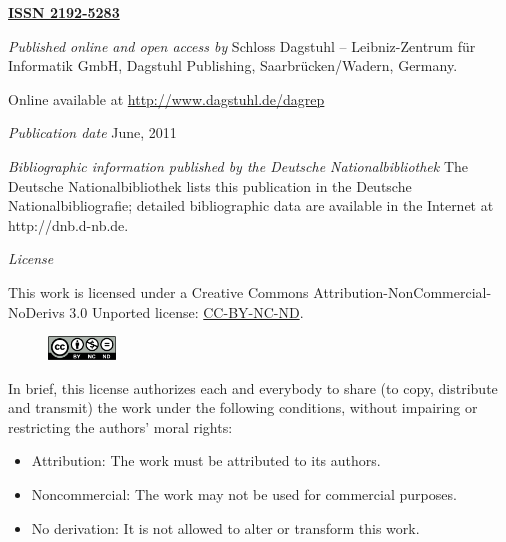 \documentclass[a4paper,USenglish]{dagrep-master}
\begin{document}
\begin{publicationinfo}%
\sffamily
\twocolumn



{\Large\bf\sffamily \textbf{\href{http://www.dagstuhl.de/dagrep}{ISSN 2192-5283}}}

\bigskip
\bigskip

\emph{Published online and open access by}\newline 
Schloss Dagstuhl -- Leibniz-Zentrum f\"ur Informatik GmbH, Dagstuhl
Publishing, Saarbr\"ucken/Wadern, Germany. 

Online available at \href{http://www.dagstuhl.de/dagrep}{http://www.dagstuhl.de/dagrep}

\bigskip
\emph{Publication date}\newline
June, 2011

\bigskip
\emph{Bibliographic information published by the Deutsche
  Nationalbibliothek}\newline 
The Deutsche Nationalbibliothek lists this publication in the Deutsche
Nationalbibliografie; detailed bibliographic data are available in the
Internet at http://dnb.d-nb.de.

\bigskip
\emph{License}

This work is licensed under  a Creative Commons
Attribution-NonCommercial-NoDerivs 3.0 Unported license:
\href{http://creativecommons.org/licenses/by-nc-nd/3.0/legalcode}{CC-BY-NC-ND}.

\begin{figure}
\vspace*{-1\baselineskip}
\includegraphics[width=1.8cm]{cc-by-nc-nd}
\end{figure} 
In brief, this license authorizes each and everybody to share (to
copy, distribute and transmit) the work under the following
conditions, without impairing or restricting the authors'
moral rights:

\begin{itemize}
\item Attribution: The work must be attributed to its authors.
\item Noncommercial: The work may not be used for commercial purposes. 
\item No derivation: It is not allowed to alter or transform this work.
\end{itemize}


\end{publicationinfo}
\end{document}
